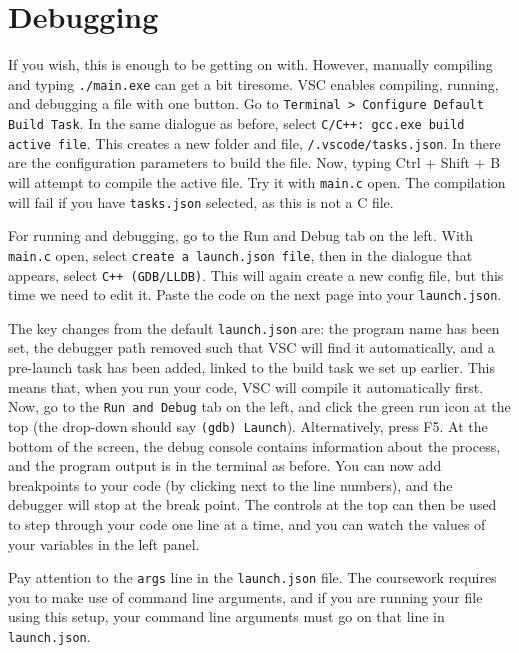 \documentclass{article}
\newcommand{\code}[1]{\colorbox{codegrey}{\lstinline|#1|}}
\begin{document}
\section{Debugging}
If you wish, this is enough to be getting on with. However, manually compiling and typing \code{./main.exe} can get a bit tiresome. VSC enables compiling, running, and debugging a file with one button. Go to  \code{Terminal > Configure Default Build Task}. In the same dialogue as before, select \code{C/C++: gcc.exe build active file}. This creates a new folder and file, \code{/.vscode/tasks.json}. In there are the configuration parameters to build the file. Now, typing Ctrl + Shift + B will attempt to compile the active file. Try it with \code{main.c} open. The compilation will fail if you have \code{tasks.json} selected, as this is not a C file.
\par
For running and debugging, go to the Run and Debug tab on the left. With \code{main.c} open, select \code{create a launch.json file}, then in the dialogue that appears, select \code{C++ (GDB/LLDB)}. This will again create a new config file, but this time we need to edit it. Paste the code on the next page into your \code{launch.json}.
\par
The key changes from the default \code{launch.json} are: the program name has been set, the debugger path removed such that VSC will find it automatically, and a pre-launch task has been added, linked to the build task we set up earlier. This means that, when you run your code, VSC will compile it automatically first. Now, go to the \code{Run and Debug} tab on the left, and click the green run icon at the top (the drop-down should say \code{(gdb) Launch}). Alternatively, press F5. At the bottom of the screen, the debug console contains information about the process, and the program output is in the terminal as before. You can now add breakpoints to your code (by clicking next to the line numbers), and the debugger will stop at the break point. The controls at the top can then be used to step through your code one line at a time, and you can watch the values of your variables in the left panel. 
\par
Pay attention to the \code{args} line in the \code{launch.json} file. The coursework requires you to make use of command line arguments, and if you are running your file using this setup, your command line arguments must go on that line in \code{launch.json}.

\newpage
\end{document}
